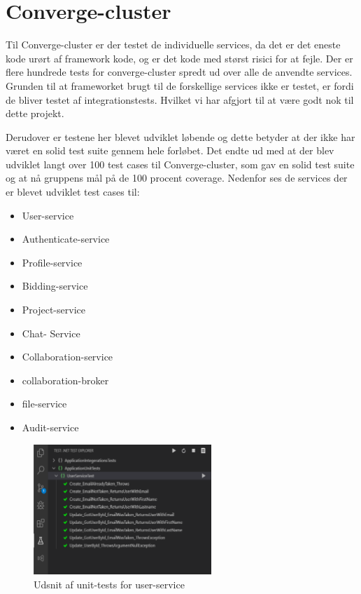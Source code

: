 \chapter{Converge-cluster}
Til Converge-cluster er der testet de individuelle services, da det er det eneste kode urørt af framework kode, og er det kode med størst risici for at fejle. Der er flere hundrede tests for converge-cluster spredt ud over alle de anvendte services. Grunden til at frameworket brugt til de forskellige services ikke er testet, er fordi de bliver testet af integrationstests. Hvilket vi har afgjort til at være godt nok til dette projekt. 

Derudover er testene her blevet udviklet løbende og dette betyder at der ikke har været en solid test suite gennem hele forløbet. Det endte ud med at der blev udviklet langt over 100 test cases til Converge-cluster, som gav en solid test suite og at nå gruppens mål på de 100 procent coverage. 
Nedenfor ses de services der er blevet udviklet test cases til:

\begin{itemize}
    \item User-service 
	\item Authenticate-service 
	\item Profile-service 
    \item Bidding-service 
	\item Project-service 
    \item Chat- Service 
	\item Collaboration-service 
	\item collaboration-broker
	\item file-service
	\item Audit-service 
\end{itemize}


\begin{figure}[ht]
    \centering
\includegraphics[width=0.6\textwidth]{Unit-Test-image/user-service-UnitTest.pdf}
\caption{Udsnit af unit-tests for user-service}
\label{fig:figure2}
\end{figure}

